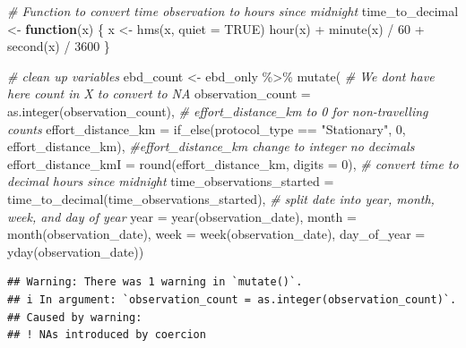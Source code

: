 \documentclass[
]{article}
\newenvironment{Shaded}{\begin{snugshade}}{\end{snugshade}}
\newcommand{\AttributeTok}[1]{\textcolor[rgb]{0.77,0.63,0.00}{#1}}
\newcommand{\CommentTok}[1]{\textcolor[rgb]{0.56,0.35,0.01}{\textit{#1}}}
\newcommand{\ConstantTok}[1]{\textcolor[rgb]{0.00,0.00,0.00}{#1}}
\newcommand{\ControlFlowTok}[1]{\textcolor[rgb]{0.13,0.29,0.53}{\textbf{#1}}}
\newcommand{\DecValTok}[1]{\textcolor[rgb]{0.00,0.00,0.81}{#1}}
\newcommand{\FunctionTok}[1]{\textcolor[rgb]{0.00,0.00,0.00}{#1}}
\newcommand{\NormalTok}[1]{#1}
\newcommand{\OtherTok}[1]{\textcolor[rgb]{0.56,0.35,0.01}{#1}}
\newcommand{\SpecialCharTok}[1]{\textcolor[rgb]{0.00,0.00,0.00}{#1}}
\newcommand{\StringTok}[1]{\textcolor[rgb]{0.31,0.60,0.02}{#1}}
\begin{document}
\begin{Shaded}
\begin{Highlighting}[]
\CommentTok{\# Function to convert time observation to hours since midnight}
\NormalTok{time\_to\_decimal }\OtherTok{\textless{}{-}} \ControlFlowTok{function}\NormalTok{(x) \{}
\NormalTok{  x }\OtherTok{\textless{}{-}} \FunctionTok{hms}\NormalTok{(x, }\AttributeTok{quiet =} \ConstantTok{TRUE}\NormalTok{)}
  \FunctionTok{hour}\NormalTok{(x) }\SpecialCharTok{+} \FunctionTok{minute}\NormalTok{(x) }\SpecialCharTok{/} \DecValTok{60} \SpecialCharTok{+} \FunctionTok{second}\NormalTok{(x) }\SpecialCharTok{/} \DecValTok{3600}
\NormalTok{\}}

\CommentTok{\# clean up variables}
\NormalTok{ebd\_count }\OtherTok{\textless{}{-}}\NormalTok{ ebd\_only }\SpecialCharTok{\%\textgreater{}\%}
  \FunctionTok{mutate}\NormalTok{(}
    \CommentTok{\# We don\textquotesingle{}t have here count in X to convert to NA}
    \AttributeTok{observation\_count =} \FunctionTok{as.integer}\NormalTok{(observation\_count),}
    \CommentTok{\# effort\_distance\_km to 0 for non{-}travelling counts}
    \AttributeTok{effort\_distance\_km =} \FunctionTok{if\_else}\NormalTok{(protocol\_type }\SpecialCharTok{==} \StringTok{"Stationary"}\NormalTok{,}
                                 \DecValTok{0}\NormalTok{, effort\_distance\_km),}
    \CommentTok{\#effort\_distance\_km change to integer no decimals}
    \AttributeTok{effort\_distance\_kmI =} \FunctionTok{round}\NormalTok{(effort\_distance\_km, }\AttributeTok{digits =} \DecValTok{0}\NormalTok{),}
    \CommentTok{\# convert time to decimal hours since midnight}
    \AttributeTok{time\_observations\_started =} \FunctionTok{time\_to\_decimal}\NormalTok{(time\_observations\_started),}
    \CommentTok{\# split date into year, month, week, and day of year}
    \AttributeTok{year =} \FunctionTok{year}\NormalTok{(observation\_date),}
    \AttributeTok{month =} \FunctionTok{month}\NormalTok{(observation\_date),}
    \AttributeTok{week =} \FunctionTok{week}\NormalTok{(observation\_date),}
    \AttributeTok{day\_of\_year =} \FunctionTok{yday}\NormalTok{(observation\_date))}
\end{Highlighting}
\end{Shaded}

\begin{verbatim}
## Warning: There was 1 warning in `mutate()`.
## i In argument: `observation_count = as.integer(observation_count)`.
## Caused by warning:
## ! NAs introduced by coercion
\end{verbatim}
\end{document}
